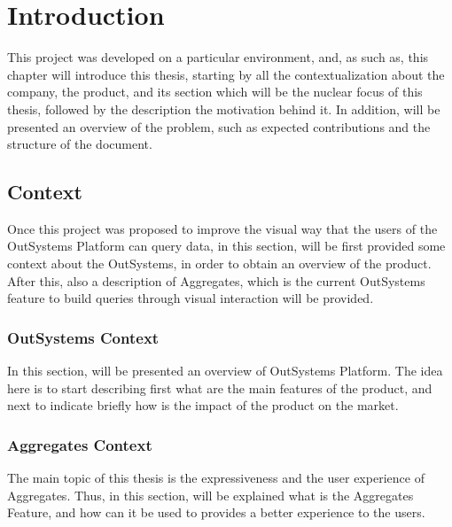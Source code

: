 \newcommand{\novathesis}{\emph{novathesis}}
\newcommand{\novathesisclass}{\texttt{novathesis.cls}}


\chapter{Introduction}
\label{cha:introduction}
This project was developed on a particular environment, and, as such as, this 
chapter will introduce this thesis, starting by all the contextualization about 
the company, the product, and its section which will be the nuclear focus of this 
thesis, followed by the description the motivation behind it. In addition, will be 
presented an overview of the problem, such as expected contributions and the 
structure of the document. 

\section{Context} 
\label{sec:context}
Once this project was proposed to improve the visual way that the users of the 
OutSystems Platform can query data, in this section, will be first provided some 
context about the OutSystems, in order to obtain an overview of the product. 
After this, also a description of Aggregates, which is the current OutSystems 
feature to build queries through visual interaction will be provided.

\subsection{OutSystems Context}
\label{subsec:outsystems_context}
In this section, will be presented an overview of OutSystems Platform. The idea
here is to start describing first what are the main features of the product, and 
next to indicate briefly how is the impact of the product on the market.

\subsection{Aggregates Context}
\label{subsec:aggregates_context}
The main topic of this thesis is the expressiveness and the user experience of 
Aggregates. Thus, in this section, will be explained what is the Aggregates 
Feature, and how can it be used to provides a better experience to the users.

